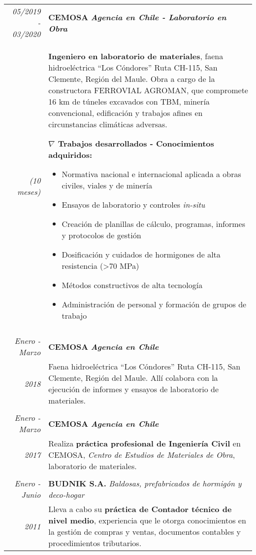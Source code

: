 \documentclass[latterpaper]{article}
\begin{document}
    \begin{tabular}{r | p{13.0 cm}}

        \emph{05/2019 - 03/2020} & \textsc{\textbf{CEMOSA}} \emph{\textbf{Agencia en Chile - Laboratorio en Obra}}\\\emph{(10 meses)}&
        \par{\textbf{Ingeniero en laboratorio de materiales}, faena hidroeléctrica ``Los Cóndores'' Ruta CH-115, San Clemente, Región del Maule. Obra a cargo de la constructora FERROVIAL AGROMAN, que compromete 16 km de túneles excavados con TBM, minería convencional, edificación  y trabajos afines en circunstancias climáticas adversas.}

\textbf{$\nabla$ Trabajos desarrollados - Conocimientos adquiridos:}
  \begin{itemize}
\item Normativa nacional e internacional aplicada a obras civiles, viales y de minería
\item Ensayos de laboratorio y controles  \emph{in-situ}
\item Creación de planillas de cálculo, programas, informes y protocolos de gestión 
\item Dosificación y cuidados de hormigones de alta resistencia (>70 MPa)
\item Métodos constructivos de alta tecnología 
\item Administración de personal y formación de grupos de trabajo
 \end{itemize}  



 \\\multicolumn{2}{c}{} \\

\emph{Enero - Marzo} & \textsc{\textbf{CEMOSA}} \emph{\textbf{Agencia en Chile}}\\\emph{2018}&
Faena hidroeléctrica ``Los Cóndores'' Ruta CH-115, San Clemente, Región del Maule.
Allí colabora con la ejecución de informes y ensayos de laboratorio de materiales.
 \\\multicolumn{2}{c}{} \\

	
\emph{Enero - Marzo} &\textsc{\textbf{CEMOSA}} \emph{\textbf{Agencia en Chile}} \\\emph{2017}& 
Realiza \textbf{práctica profesional de Ingeniería Civil} en CEMOSA, \emph{Centro de Estudios de Materiales de Obra}, laboratorio de materiales.
\\\multicolumn{2}{c}{} \\


\emph{Enero - Junio} & \textbf{\textsc{BUDNIK S.A.}} \emph{Baldosas, prefabricados de hormigón y deco-hogar}\\\emph{2011}&
Lleva a cabo su \textbf{práctica de Contador técnico de nivel medio}, experiencia que le otorga conocimientos en la gestión de compras y ventas, documentos contables y procedimientos tributarios.
	
\end{tabular}	
\end{document}
